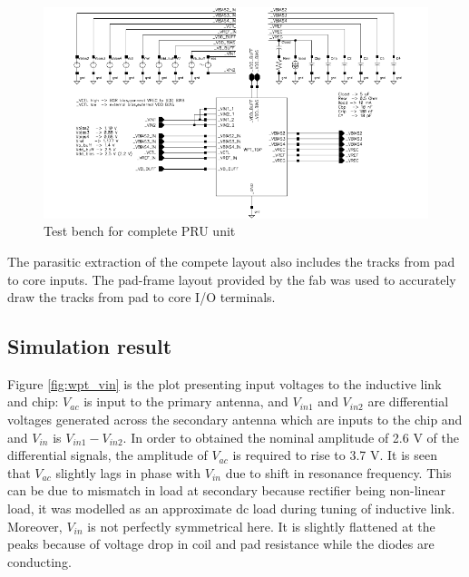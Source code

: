 \documentclass[12pt,a4paper,UKenglish]{report}
\begin{document}
\begin{figure} [H]
  \centering
  \includegraphics[width=1.05\textwidth]{img/wpt_top_testbench.pdf} 
 \caption{Test bench for complete PRU unit } 
\label{fig:wpt_top_link} 
\end{figure}

The parasitic extraction of the compete layout also includes the tracks from pad to core inputs. The pad-frame layout provided by the fab was used to accurately draw the tracks from pad to core I/O terminals. \\

\subsection{Simulation result}	%
Figure \ref{fig:wpt_vin} is the plot presenting input voltages to the inductive link and chip: $V_{ac}$ is input to the 
primary antenna, and $V_{in1}$ and $V_{in2}$ are differential voltages generated across the secondary antenna which are 
inputs to the chip and and 
$V_{in}$ is $V_{in1} - V_{in2}$. In order to obtained the nominal amplitude of 2.6 V of the differential signals, 
the amplitude of $V_{ac}$ is required to rise to 3.7 \si{\volt}. It is seen that $V_{ac}$ slightly lags in phase with $V_{in}$ due to shift 
in resonance frequency. This can be due to mismatch in load at secondary because rectifier being non-linear load, it was 
modelled as an approximate dc load during tuning of inductive link. Moreover, $V_{in}$ is not perfectly symmetrical here. It is slightly 
flattened at the peaks because of voltage drop in coil and pad resistance while the diodes are conducting.\\
\end{document}
